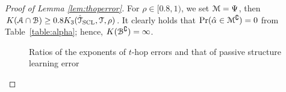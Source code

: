 \begin{proof}[Proof of Lemma \ref{lem:thoperror}]
	For $\rho\in[0.8,1)$, we set $\mathcal{M}=\Psi$, then $K ( \mathcal{A}\cap \mathcal{B})\geq 0.8K _{3}(\hat{\mathcal{T}}_{{\rm SCL}},\mathcal{T},\rho)$. It clearly holds that  $\Pr(\hat{\alpha}\in \mathcal{M}^{\complement})=0$ from Table~\ref{table:alpha}; hence,  $K (\mathcal{B}^{\complement})=\infty$. 
	\begin{figure}[t] 
		\centering
		\hspace{.15in}
		\centering
		\caption{Ratios of the exponents of $t$-hop errors and that of passive structure learning error}
	\end{figure}


\end{proof}
